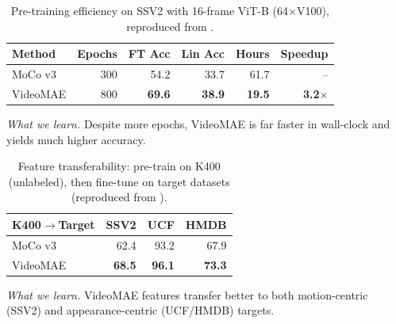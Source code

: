 \begin{enrichment}
\begin{enrichment}
    \begin{table}[H]
        \centering
        \small
        \setlength{\tabcolsep}{6pt}
        \caption{Pre-training efficiency on SSV2 with 16-frame ViT-B (64$\times$V100), reproduced from \cite{tong2022_videomae}.}
        \label{tab:videomae_tbl3}
        \begin{tabular}{lrrrrr}
            \toprule
            \textbf{Method} & \textbf{Epochs} & \textbf{FT Acc} & \textbf{Lin Acc} & \textbf{Hours} & \textbf{Speedup} \\
            \midrule
            MoCo v3  & 300 & 54.2 & 33.7 & 61.7 & -- \\
            VideoMAE & 800 & \textbf{69.6} & \textbf{38.9} & \textbf{19.5} & \textbf{3.2$\times$} \\
            \bottomrule
        \end{tabular}
    \end{table}
    \noindent\emph{What we learn.} Despite more epochs, VideoMAE is far faster in wall-clock and yields much higher accuracy.
    
    
    \begin{table}[H]
        \centering
        \small
        \setlength{\tabcolsep}{6pt}
        \caption{Feature transferability: pre-train on K400 (unlabeled), then fine-tune on target datasets (reproduced from \cite{tong2022_videomae}).}
        \label{tab:videomae_tbl4}
        \begin{tabular}{lrrr}
            \toprule
            \textbf{K400$\rightarrow$Target} & \textbf{SSV2} & \textbf{UCF} & \textbf{HMDB} \\
            \midrule
            MoCo v3  & 62.4 & 93.2 & 67.9 \\
            VideoMAE & \textbf{68.5} & \textbf{96.1} & \textbf{73.3} \\
            \bottomrule
        \end{tabular}
    \end{table}
    \noindent\emph{What we learn.} VideoMAE features transfer better to both motion-centric (SSV2) and appearance-centric (UCF/HMDB) targets.
    
    

\end{enrichment}
\end{enrichment}
